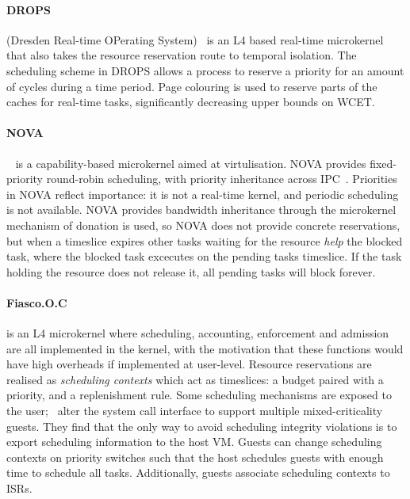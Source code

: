 \paragraph{DROPS} (Dresden Real-time OPerating System)~\citep{Haertig_BBHHMRSW_98} is an L4 based real-time microkernel that also takes the resource reservation route to temporal isolation.
The scheduling scheme in DROPS allows a process to reserve a priority for an amount of cycles during a time period.
Page colouring is used to reserve parts of the caches for real-time tasks, significantly decreasing upper bounds on \gls{WCET}.

\paragraph{NOVA}~\citep{Steinburg_Kauer_10} is a capability-based microkernel aimed at virtulisation. 
NOVA provides fixed-priority round-robin scheduling, with priority inheritance across IPC~\citep{Steinburg_BK_2010}.
Priorities in NOVA reflect importance: it is not a real-time kernel, and periodic scheduling is not available.  
NOVA provides bandwidth inheritance through the microkernel mechanism of donation is used, so NOVA does not provide concrete reservations, but when a timeslice expires other tasks waiting for the resource \emph{help} the blocked task, where the blocked task excecutes on the pending tasks timeslice.
If the task holding the resource does not release it, all pending tasks will block forever.


\paragraph{Fiasco.O.C} is an L4 microkernel where scheduling, accounting, enforcement and admission are all implemented in the kernel, with the motivation that these functions would have high overheads if implemented at user-level. 
Resource reservations are realised as \emph{scheduling contexts} which act as timeslices: a budget paired with a priority, and a replenishment rule. 
Some scheduling mechanisms are exposed to the user;~\citet{Lackorzynski_WVH_12} alter the system call interface to support multiple mixed-criticality guests.
They find that the only way to avoid scheduling integrity violations is to export scheduling information to the host \gls{VM}.
Guests can change scheduling contexts on priority switches such that the host schedules guests with enough time to schedule all tasks.
Additionally, guests associate scheduling contexts to \glspl{ISR}.

